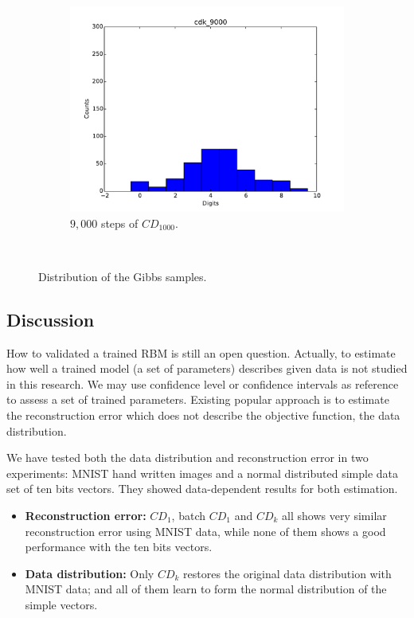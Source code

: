 \begin{figure}[hbt]
\begin{subfigure}[t]{0.18\textwidth}
  			\includegraphics[width=\textwidth]{pics_sdbn/gibbs_cdk_9000.pdf}
  		    \caption{$9,000$ steps of $CD_{1000}$.}
  		\end{subfigure}\\
  \caption{
  Distribution of the Gibbs samples.
  }
  \label{Fig:vector}
\end{figure}

\subsection{Discussion}
	How to validated a trained RBM is still an open question.
	Actually, to estimate how well a trained model (a set of parameters) describes given data is not studied in this research.
	We may use confidence level or confidence intervals as reference to assess a set of trained parameters.
	Existing popular approach is to estimate the reconstruction error which does not describe the objective function, the data distribution.
	
	We have tested both the data distribution and reconstruction error in two experiments: MNIST hand written images and a normal distributed simple data set of ten bits vectors. 
	They showed data-dependent results for both estimation.
	\begin{itemize}
		\item \textbf{Reconstruction error:} $CD_1$, batch $CD_1$ and $CD_k$ all shows very similar reconstruction error using MNIST data, while none of them shows a good performance with the ten bits vectors.
		\item \textbf{Data distribution:} Only $CD_k$ restores the original data distribution with MNIST data; and all of them learn to form the normal distribution of the simple vectors.
	\end{itemize}
